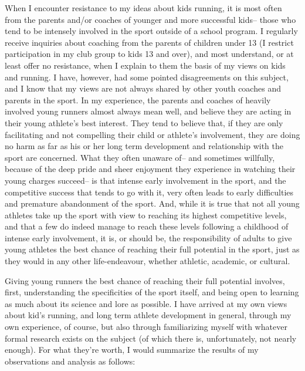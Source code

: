 When I encounter resistance to my ideas about kids running, it is most often from the parents and/or coaches of younger and more successful kids-- those who tend to be intensely involved in the sport outside of a school program. I regularly receive inquiries about coaching from the parents of children under 13 (I restrict participation in my club group to kids 13 and over), and most understand, or at least offer no resistance, when I explain to them the basis of my views on kids and running. I have, however, had some pointed disagreements on this subject, and I know that my views are not always shared by other youth coaches and parents in the sport. In my experience, the parents and coaches of heavily involved young runners almost always mean well, and believe they are acting in their young athlete's best interest. They tend to believe that, if they are only facilitating and not compelling their child or athlete's involvement, they are doing no harm as far as his or her long term development and relationship with the sport are concerned. What they often unaware of-- and sometimes willfully, because of the deep pride and sheer enjoyment they experience in watching their young charges succeed-- is that intense early involvement in the sport, and the competitive success that tends to go with it, very often leads to early difficulties and premature abandonment of the sport. And, while it is true that not all young athletes take up the sport with view to reaching its highest competitive levels, and that a few do indeed manage to reach these levels following a childhood of intense early involvement, it is, or should be, the responsibility of adults to give young athletes the best chance of reaching their full potential in the sport, just as they would in any other life-endeavour, whether athletic, academic, or cultural.

Giving young runners the best chance of reaching their full potential involves, first, understanding the specificities of the sport itself, and being open to learning as much about its science and lore as possible. I have arrived at my own views about kid's running, and long term athlete development in general, through my own experience, of course, but also through familiarizing myself with whatever formal research exists on the subject (of which there is, unfortunately, not nearly enough). For what they're worth, I would summarize the results of my observations and analysis as follows:

